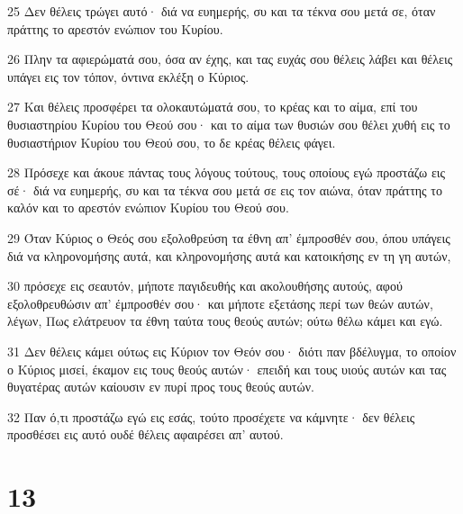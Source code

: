 \par 25 Δεν θέλεις τρώγει αυτό· διά να ευημερής, συ και τα τέκνα σου μετά σε, όταν πράττης το αρεστόν ενώπιον του Κυρίου.
\par 26 Πλην τα αφιερώματά σου, όσα αν έχης, και τας ευχάς σου θέλεις λάβει και θέλεις υπάγει εις τον τόπον, όντινα εκλέξη ο Κύριος.
\par 27 Και θέλεις προσφέρει τα ολοκαυτώματά σου, το κρέας και το αίμα, επί του θυσιαστηρίου Κυρίου του Θεού σου· και το αίμα των θυσιών σου θέλει χυθή εις το θυσιαστήριον Κυρίου του Θεού σου, το δε κρέας θέλεις φάγει.
\par 28 Πρόσεχε και άκουε πάντας τους λόγους τούτους, τους οποίους εγώ προστάζω εις σέ· διά να ευημερής, συ και τα τέκνα σου μετά σε εις τον αιώνα, όταν πράττης το καλόν και το αρεστόν ενώπιον Κυρίου του Θεού σου.
\par 29 Όταν Κύριος ο Θεός σου εξολοθρεύση τα έθνη απ' έμπροσθέν σου, όπου υπάγεις διά να κληρονομήσης αυτά, και κληρονομήσης αυτά και κατοικήσης εν τη γη αυτών,
\par 30 πρόσεχε εις σεαυτόν, μήποτε παγιδευθής και ακολουθήσης αυτούς, αφού εξολοθρευθώσιν απ' έμπροσθέν σου· και μήποτε εξετάσης περί των θεών αυτών, λέγων, Πως ελάτρευον τα έθνη ταύτα τους θεούς αυτών; ούτω θέλω κάμει και εγώ.
\par 31 Δεν θέλεις κάμει ούτως εις Κύριον τον Θεόν σου· διότι παν βδέλυγμα, το οποίον ο Κύριος μισεί, έκαμον εις τους θεούς αυτών· επειδή και τους υιούς αυτών και τας θυγατέρας αυτών καίουσιν εν πυρί προς τους θεούς αυτών.
\par 32 Παν ό,τι προστάζω εγώ εις εσάς, τούτο προσέχετε να κάμνητε· δεν θέλεις προσθέσει εις αυτό ουδέ θέλεις αφαιρέσει απ' αυτού.

\chapter{13}

